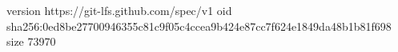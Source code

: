 version https://git-lfs.github.com/spec/v1
oid sha256:0ed8be27700946355c81c9f05c4ccea9b424e87cc7f624e1849da48b1b81f698
size 73970
